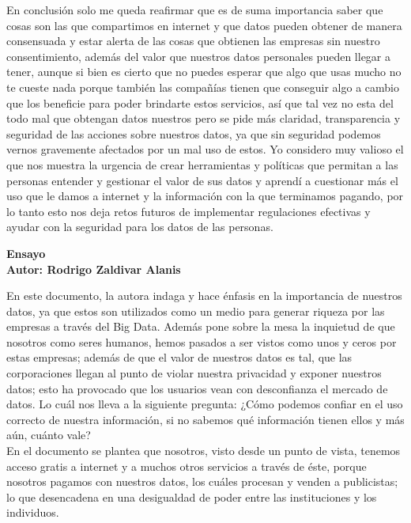 \documentclass[12pt]{report}
\begin{document}
\begin{enumerate}[label=\textbf{\arabic*.}, leftmargin=*]
\begin{enumerate}[label=\textbf{\alph*.}, leftmargin=*, itemsep=1.0em]
En conclusión solo me queda reafirmar que es de suma importancia saber que cosas son las que compartimos en internet y que datos pueden obtener de manera consensuada y estar alerta de las cosas que obtienen las empresas sin nuestro consentimiento, además del valor que nuestros datos personales pueden llegar a tener, aunque si bien es cierto que no puedes esperar que algo que usas mucho no te cueste nada porque también las compañías tienen que conseguir algo a cambio que los beneficie para poder brindarte estos servicios, así que tal vez no esta del todo mal que obtengan datos nuestros pero se pide más claridad, transparencia y seguridad de las acciones sobre nuestros datos, ya que sin seguridad podemos vernos gravemente afectados por un mal uso de estos. Yo considero muy valioso el que nos muestra la urgencia de crear herramientas y políticas que permitan a las personas entender y gestionar el valor de sus datos y aprendí a cuestionar más el uso que le damos a internet y la información con la que terminamos pagando, por lo tanto esto nos deja retos futuros de implementar regulaciones efectivas y ayudar con la seguridad para los datos de las personas.
\end{enumerate}



\newpage
\textbf{Ensayo\\
        Autor: Rodrigo Zaldivar Alanis}

En este documento, la autora indaga y hace énfasis en la importancia de nuestros datos, ya que estos son utilizados como un medio para generar riqueza por las empresas a través del Big Data. Además pone sobre la mesa la inquietud de que nosotros como seres humanos, hemos pasados a ser vistos como unos y ceros por estas empresas; además de que el valor de nuestros datos es tal, que las corporaciones llegan al punto de violar nuestra privacidad y exponer nuestros datos; esto ha provocado que los usuarios vean con desconfianza el mercado de datos. Lo cuál nos lleva a la siguiente pregunta: ¿Cómo podemos confiar en el uso correcto de nuestra información, si no sabemos qué información tienen ellos y más aún, cuánto vale?\\

En el documento se plantea que nosotros, visto desde un punto de vista, tenemos acceso gratis a internet y a muchos otros servicios a través de éste, porque nosotros pagamos con nuestros datos, los cuáles procesan y venden a publicistas; lo que desencadena en una desigualdad de poder entre las instituciones y los individuos.


\end{enumerate}
\end{document}

